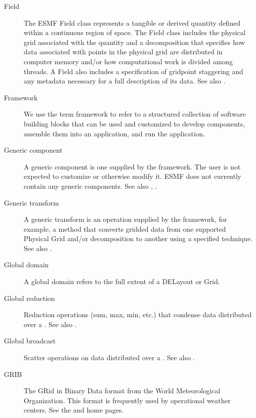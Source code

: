 \begin{description}
\label{glos:Field} 
\item[Field] The ESMF Field class represents a tangible or derived quantity
defined within a continuous region of space.  The Field class includes
the physical grid associated with the quantity and a decomposition
that specifies how data associated with points in the 
physical grid are distributed in computer memory and/or how computational 
work is divided among threads.  A Field also includes a specification 
of gridpoint staggering and any metadata necessary for a full description
of its data.  See also .

\label{glos:Framework} 
\item[Framework] We use the term framework to 
  refer to a structured collection of software building blocks that can be used 
  and customized to develop components, assemble them into an application, and 
  run the application.

\label{glos:GenericComp} 
\item[Generic component] A generic component
  is one supplied by the framework.  The user is not expected to 
  customize or otherwise modify it.  ESMF does not currently contain any
  generic components.  See also , 
  . 

\label{glos:GenericTrans} 
\item[Generic transform] A generic transform 
  is an operation supplied by the framework, for example, a method 
  that converts gridded data from one supported Physical Grid and/or 
  decomposition to another using a specified technique.  See also .

\label{glos:GlobDomain}
\item[Global domain] 
  A global domain refers to the full extent of a DELayout or Grid.

\label{glos:GlobReduction} 
\item[Global reduction] 
  Reduction operations (sum, max, min, etc.) that condense data distributed
  over a .
  See also .

\label{glos:GlobBroadcast}
\item[Global broadcast] 
  Scatter operations on data distributed over a 
  .
  See also .

\label{glos:GRIB}
\item[GRIB]
  The GRid in Binary Data format from the World Meteorological Organization.
This format is frequently used by operational weather centers.  See the
 and
 home pages.


\end{description}
